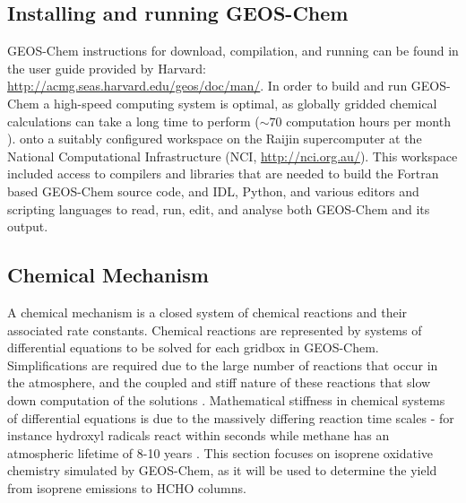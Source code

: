   \subsection{Installing and running GEOS-Chem}
    \label{Model:GC:running}
    GEOS-Chem instructions for download, compilation, and running can be found in the user guide provided by Harvard: \url{http://acmg.seas.harvard.edu/geos/doc/man/}.
    In order to build and run GEOS-Chem a high-speed computing system is optimal, as globally gridded chemical calculations can take a long time to perform ($\sim 70$ computation hours per month ).
     onto a suitably configured workspace on the Raijin supercomputer at the National Computational Infrastructure (NCI, \url{http://nci.org.au/}).
    This workspace included access to compilers and libraries that are needed to build the Fortran based GEOS-Chem source code, and IDL, Python, and various editors and scripting languages to read, run, edit, and analyse both GEOS-Chem and its output.

  \subsection{Chemical Mechanism}
    \label{Model:GC:mechanisms}
    A chemical mechanism is a closed system of chemical reactions and their associated rate constants.
    Chemical reactions are represented by systems of differential equations to be solved for each gridbox in GEOS-Chem.
    Simplifications are required due to the large number of reactions that occur in the atmosphere, and the coupled and stiff nature of these reactions that slow down computation of the solutions \parencite{BrasseurJacob2017}.
    Mathematical stiffness in chemical systems of differential equations is due to the massively differing reaction time scales - for instance hydroxyl radicals react within seconds while methane has an atmospheric lifetime of 8-10 years \parencite{Wuebbles2002}. 
    This section focuses on isoprene oxidative chemistry simulated by GEOS-Chem, as it will be used to determine the yield from isoprene emissions to HCHO columns. 

